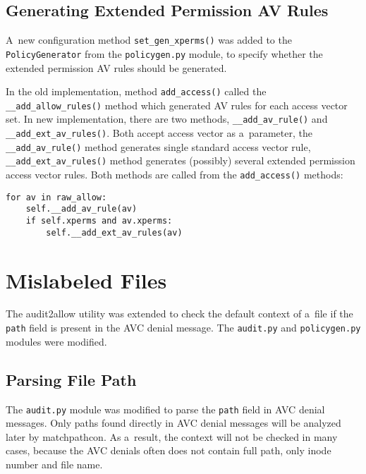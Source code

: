 \subsection{Generating Extended Permission AV Rules}
A~new configuration method \texttt{set\_gen\_xperms()} was added to the
\texttt{PolicyGenerator} from the \texttt{policygen.py} module, to specify
whether the extended permission AV rules should be generated.

In the old implementation, method \texttt{add\_access()} called the
\texttt{\_\_add\_allow\_rules()} method which generated AV rules for each
access vector set. In new implementation, there are two methods,
\texttt{\_\_add\_av\_rule()} and \texttt{\_\_add\_ext\_av\_rules()}. Both accept
access vector as a~parameter, the \texttt{\_\_add\_av\_rule()} method generates
single standard access vector rule, \texttt{\_\_add\_ext\_av\_rules()} method
generates (possibly) several extended permission access vector rules. Both
methods are called from the \texttt{add\_access()} methods:
\begin{lstlisting}
for av in raw_allow:
    self.__add_av_rule(av)
    if self.xperms and av.xperms:
        self.__add_ext_av_rules(av)
\end{lstlisting}


\section{Mislabeled Files}
\label{mislabeledimp}
The audit2allow utility was extended to check the default context of a~file if
the \texttt{path} field is present in the AVC denial message. The
\texttt{audit.py} and \texttt{policygen.py} modules were modified.

\subsection{Parsing File Path}
The \texttt{audit.py} module was modified to parse the \texttt{path} field in
AVC denial messages. Only paths found directly in AVC denial messages will be
analyzed later by matchpathcon. As a~result, the context will not be checked in
many cases, because the AVC denials often does not contain full path, only inode
number and file name.

